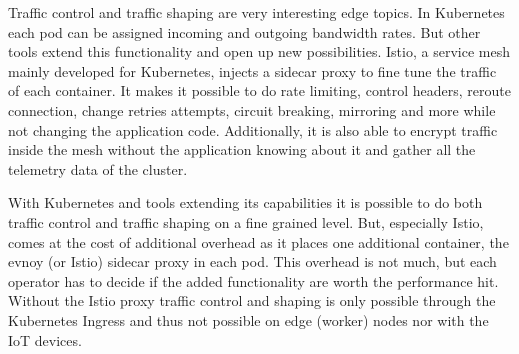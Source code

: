 Traffic control and traffic shaping are very interesting edge topics. In Kubernetes each pod can be assigned incoming and outgoing bandwidth rates. But other tools extend this functionality and open up new possibilities. Istio, a service mesh mainly developed for Kubernetes, injects a sidecar proxy to fine tune the traffic of each container. It makes it possible to do rate limiting, control headers, reroute connection, change retries attempts, circuit breaking, mirroring and more while not changing the application code. Additionally, it is also able to encrypt traffic inside the mesh without the application knowing about it and gather all the telemetry data of the cluster.

With Kubernetes and tools extending its capabilities it is possible to do both traffic control and traffic shaping on a fine grained level. But, especially Istio, comes at the cost of additional overhead as it places one additional container, the evnoy (or Istio) sidecar proxy in each pod. This overhead is not much, but each operator has to decide if the added functionality are worth the performance hit. Without the Istio proxy traffic control and shaping is only possible through the Kubernetes Ingress and thus not possible on edge (worker) nodes nor with the IoT devices.
